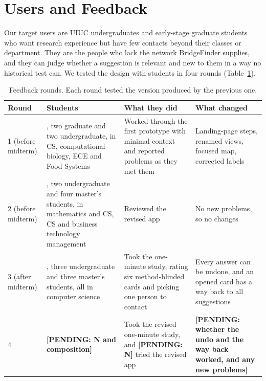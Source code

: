 \documentclass[sigconf,nonacm]{acmart}
\newcommand{\pending}[1]{\textcolor{red!70!black}{\textbf{[PENDING: #1]}}}
\begin{document}
\section{Users and Feedback}\label{sec:users}
Our target users are UIUC undergraduates and early-stage graduate students who want research experience but have few contacts beyond their classes or department. They are the people who lack the network BridgeFinder supplies, and they can judge whether a suggestion is relevant and new to them in a way no historical test can. We tested the design with students in four rounds (Table~\ref{tab:rounds}).

\begin{table}[t]
\caption{Feedback rounds. Each round tested the version produced by the previous one.}
\label{tab:rounds}
\small
\begin{tabularx}{\textwidth}{@{}l>{\raggedright\arraybackslash}p{}>{\raggedright\arraybackslash}X>{\raggedright\arraybackslash}X@{}}
\toprule
Round & Students & What they did & What changed\\
\midrule
1 (before midterm) & 4, two graduate and two undergraduate, in CS, computational biology, ECE and Food Systems & Worked through the first prototype with minimal context and reported problems as they met them & Landing-page steps, renamed views, focused map, corrected labels\\
2 (before midterm) & 6, two undergraduate and four master's students, in mathematics and CS, CS and business technology management & Reviewed the revised app & No new problems, so no changes\\
3 (after midterm) & 6, three undergraduate and three master's students, all in computer science & Took the one-minute study, rating six method-blinded cards and picking one person to contact & Every answer can be undone, and an opened card has a way back to all suggestions\\
4 & \pending{N and composition} & Took the revised one-minute study, and \pending{N} tried the revised app & \pending{whether the undo and the way back worked, and any new problems}\\
\bottomrule
\end{tabularx}
\end{table}
\end{document}
